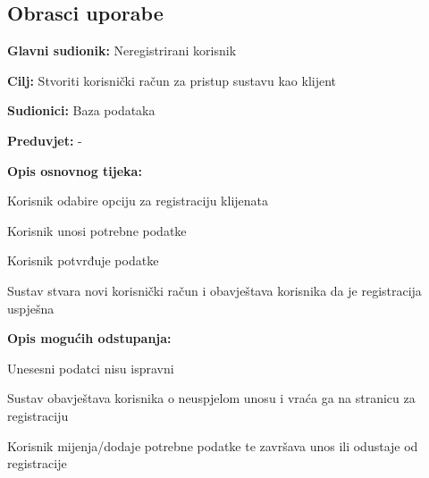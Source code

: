			\eject 
			
			
				
			\subsection{Obrasci uporabe}
					

					\noindent {}
					\begin{packed_item}
	
						\item \textbf{Glavni sudionik:} Neregistrirani korisnik
						\item  \textbf{Cilj:} Stvoriti korisnički račun za pristup sustavu kao klijent
						\item  \textbf{Sudionici:} Baza podataka
						\item  \textbf{Preduvjet:} -
						\item  \textbf{Opis osnovnog tijeka:}
						
						\item[] \begin{packed_enum}
	
							\item Korisnik odabire opciju za registraciju klijenata
							\item Korisnik unosi potrebne podatke
							\item Korisnik potvrđuje podatke
							\item Sustav stvara novi korisnički račun i obavještava korisnika da je registracija uspješna
						\end{packed_enum}
						
						\item  \textbf{Opis mogućih odstupanja:}
						
						\item[] \begin{packed_item}
	
							\item[3.a] Unesesni podatci nisu ispravni
							\item[] \begin{packed_enum}
								
								\item Sustav obavještava korisnika o neuspjelom unosu i vraća ga na stranicu za registraciju
								\item Korisnik mijenja/dodaje potrebne podatke te završava unos ili odustaje od registracije
								
							\end{packed_enum}
							
						\end{packed_item}
					\end{packed_item}
				
